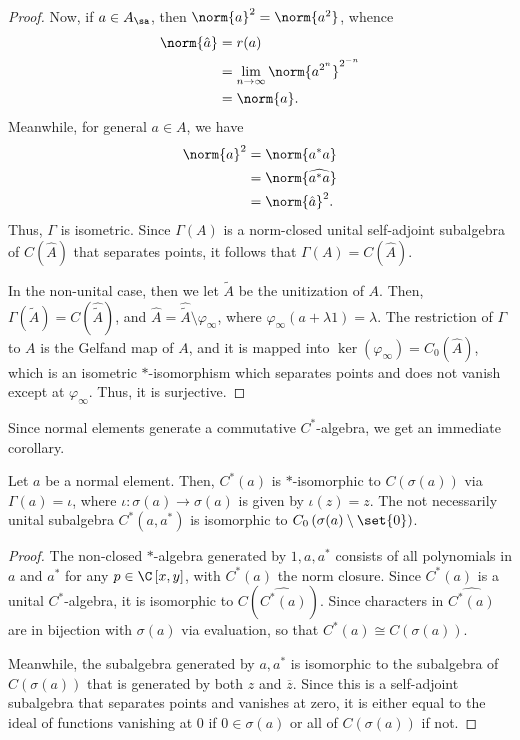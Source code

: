 \documentclass[10pt]{mypackage}
\begin{document}
\begin{proof}
  Now, if $a\in A_{\sa}$, then $\norm{a}^2 = \norm{a^2}$, whence
  \begin{align*}
    \norm{\hat{a}} &= r(a)\\
                   &= \lim_{n\rightarrow\infty}\norm{a^{2^n}}^{2^{-n}}\\
                   &= \norm{a}.
  \end{align*}
  Meanwhile, for general $a\in A$, we have
  \begin{align*}
    \norm{a}^2 &= \norm{a^{\ast}a}\\
               &= \norm{\widehat{a^{\ast}a}}\\
               &= \norm{\hat{a}}^2.
  \end{align*}
  Thus, $\Gamma$ is isometric. Since $\Gamma(A)$ is a norm-closed unital self-adjoint subalgebra of $C(\hat{A})$ that separates points, it follows that $\Gamma(A) = C(\hat{A})$.

  In the non-unital case, then we let $\widetilde{A}$ be the unitization of $A$. Then, $\Gamma(\widetilde{A}) = C(\widehat{\widetilde{A}})$, and $\hat{A} = \widehat{\widetilde{A}}\setminus \varphi_{\infty}$, where $\varphi_{\infty}(a + \lambda 1) = \lambda$. The restriction of $\Gamma$ to $A$ is the Gelfand map of $A$, and it is mapped into $\ker\left( \varphi_{\infty} \right) = C_0( \hat{A} )$, which is an isometric $\ast$-isomorphism which separates points and does not vanish except at $\varphi_{\infty}$. Thus, it is surjective.
\end{proof}
Since normal elements generate a commutative $C^{\ast}$-algebra, we get an immediate corollary.
\begin{corollary}
  Let $a$ be a normal element. Then, $C^{\ast}(a)$ is $\ast$-isomorphic to $C(\sigma(a))$ via $\Gamma(a) = \iota$, where $\iota\colon \sigma(a)\rightarrow \sigma(a)$ is given by $\iota(z) = z$. The not necessarily unital subalgebra $C^{\ast}\left( a,a^{\ast} \right)$ is isomorphic to $C_0\left( \sigma(a)\setminus \set{0} \right)$.
\end{corollary}
\begin{proof}
  The non-closed $\ast$-algebra generated by $1,a,a^{\ast}$ consists of all polynomials in $a$ and $a^{\ast}$ for any $p\in \C\left[ x,y \right]$, with $C^{\ast}(a)$ the norm closure. Since $C^{\ast}(a)$ is a unital $C^{\ast}$-algebra, it is isomorphic to $C(\widehat{C^{\ast}(a)})$. Since characters in $\widehat{C^{\ast}(a)}$ are in bijection with $\sigma(a)$ via evaluation, so that $C^{\ast}(a)\cong C(\sigma(a))$.

  Meanwhile, the subalgebra generated by $a,a^{\ast}$ is isomorphic to the subalgebra of $C(\sigma(a))$ that is generated by both $z$ and $\overline{z}$. Since this is a self-adjoint subalgebra that separates points and vanishes at zero, it is either equal to the ideal of functions vanishing at $0$ if $0\in \sigma(a)$ or all of $C(\sigma(a))$ if not.
\end{proof}
\end{document}
